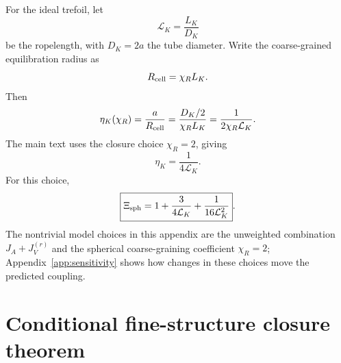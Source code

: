 \documentclass[aps,pra,preprint,longbibliography,nofootinbib]{revtex4-2}
\begin{document}
For the ideal trefoil, let
\begin{equation}
  \mathcal L_K=\frac{L_K}{D_K}
  \label{eq:app_ropelength}
\end{equation}
be the ropelength, with $D_K=2a$ the tube diameter.  Write the
coarse-grained equilibration radius as
\begin{equation}
  R_{\rm cell}=\chi_R L_K .
  \label{eq:app_Rcell_chi}
\end{equation}
Then
\begin{equation}
  \eta_K(\chi_R)=\frac{a}{R_{\rm cell}}
  =\frac{D_K/2}{\chi_R L_K}
  =\frac{1}{2\chi_R\mathcal L_K}.
  \label{eq:app_eta_k_general}
\end{equation}
The main text uses the closure choice $\chi_R=2$, giving
\begin{equation}
  \eta_K=\frac{1}{4\mathcal L_K}.
  \label{eq:app_eta_k}
\end{equation}
For this choice,
\begin{equation}
  \boxed{\Xi_{\rm sph}
  =1+\frac{3}{4\mathcal L_K}+\frac{1}{16\mathcal L_K^2}} .
  \label{eq:app_xi_k}
\end{equation}
The nontrivial model choices in this appendix are the unweighted
combination $J_A+J_V^{(r)}$ and the spherical coarse-graining coefficient
$\chi_R=2$; Appendix~\ref{app:sensitivity} shows how changes in these
choices move the predicted coupling.

\section{Conditional fine-structure closure theorem}
\label{app:alpha_theorem}
\end{document}
